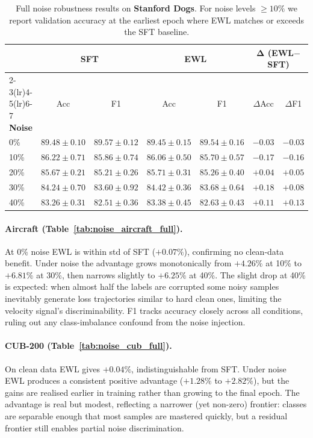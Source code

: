 \begin{table}[h]
  \centering
  \caption{
    Full noise robustness results on \textbf{Stanford Dogs}.
    For noise levels $\geq 10\%$ we report validation accuracy at the
    earliest epoch where EWL matches or exceeds the SFT baseline.
  }
  \label{tab:noise_dogs_full}
  \setlength{\tabcolsep}{5pt}
  \begin{tabular}{lcccccc}
    \toprule
    & \multicolumn{2}{c}{\textbf{SFT}} & \multicolumn{2}{c}{\textbf{EWL}} & \multicolumn{2}{c}{$\boldsymbol{\Delta}$ \textbf{(EWL$-$SFT)}} \\
    \cmidrule(lr){2-3}\cmidrule(lr){4-5}\cmidrule(lr){6-7}
    \textbf{Noise} & Acc & F1 & Acc & F1 & $\Delta$Acc & $\Delta$F1 \\
    \midrule
    0\%  & $89.48{\pm}0.10$ & $89.57{\pm}0.12$ & $89.45{\pm}0.15$ & $89.54{\pm}0.16$ & $-0.03$ & $-0.03$ \\
    10\% & $86.22{\pm}0.71$ & $85.86{\pm}0.74$ & $86.06{\pm}0.50$ & $85.70{\pm}0.57$ & $-0.17$ & $-0.16$ \\
    20\% & $85.67{\pm}0.21$ & $85.21{\pm}0.26$ & $85.71{\pm}0.31$ & $85.26{\pm}0.40$ & $+0.04$ & $+0.05$ \\
    30\% & $84.24{\pm}0.70$ & $83.60{\pm}0.92$ & $84.42{\pm}0.36$ & $83.68{\pm}0.64$ & $+0.18$ & $+0.08$ \\
    40\% & $83.26{\pm}0.31$ & $82.51{\pm}0.36$ & $83.38{\pm}0.45$ & $82.63{\pm}0.43$ & $+0.11$ & $+0.13$ \\
    \bottomrule
  \end{tabular}
\end{table}

\paragraph{Aircraft (Table~\ref{tab:noise_aircraft_full}).}
At 0\% noise EWL is within std of SFT ($+0.07\%$), confirming no clean-data
benefit.
Under noise the advantage grows monotonically from $+4.26\%$ at 10\% to
$+6.81\%$ at 30\%, then narrows slightly to $+6.25\%$ at 40\%.
The slight drop at 40\% is expected: when almost half the labels are corrupted
some noisy samples inevitably generate loss trajectories similar to hard clean
ones, limiting the velocity signal's discriminability.
F1 tracks accuracy closely across all conditions, ruling out any class-imbalance
confound from the noise injection.

\paragraph{CUB-200 (Table~\ref{tab:noise_cub_full}).}
On clean data EWL gives $+0.04\%$, indistinguishable from SFT.
Under noise EWL produces a consistent positive advantage ($+1.28\%$ to
$+2.82\%$), but the gains are realised earlier in training rather than growing
to the final epoch.
The advantage is real but modest, reflecting a narrower (yet non-zero)
frontier: classes are separable enough that most samples are mastered quickly,
but a residual frontier still enables partial noise discrimination.

